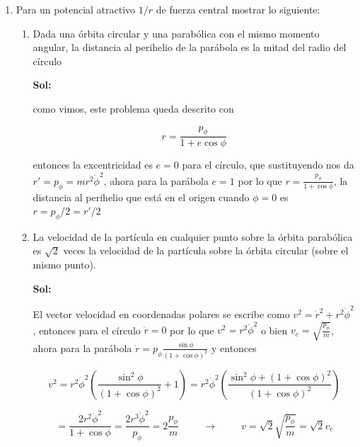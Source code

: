 \documentclass[12pt,a4paper]{article}
\begin{document}
\begin{enumerate}
\item Para un potencial atractivo $1/r$ de fuerza central mostrar lo siguiente:

\begin{enumerate}
    \item Dada una órbita circular y una parabólica con el mismo momento angular, la distancia al perihelio de la parábola es la mitad del radio del círculo
    
    \textbf{Sol:}
    
    como vimos, este problema queda descrito con
    
    \begin{equation*}
        r = \frac{p_\phi}{1 + e \cos{\phi}}
    \end{equation*}
    
    entonces la excentricidad es $e = 0$ para el círculo, que sustituyendo nos da $r' = p_{\phi}= mr^2 \dot{\phi}^2$, ahora para la parábola $e = 1 $ por lo que $r = \frac{p_{\phi}}{1 + \cos{\phi}}$, la distancia al perihelio que está en el origen cuando $\phi = 0$ es $r = p_{\phi}/2 = r' /2$
    
    
    
    \item La velocidad de la partícula en cualquier punto sobre la órbita parabólica es $\sqrt{2}$ veces la velocidad de la partícula sobre la órbita circular (sobre el mismo punto).
    
    \textbf{Sol:}
    
    El vector velocidad en coordenadas polares se escribe como $v^2 = \dot{r}^2 + r^2 \dot{\phi}^2 $, entonces para el círculo $\dot{r} = 0$ por lo que  $v^2 = r^2 \dot{\phi}^2 $  o bien $v_c = \sqrt{\frac{p_{\phi}}{m}}$, ahora para la parábola  $\dot{r} = p_{\phi} \frac{\sin{\phi}}{(1 + \cos{\phi})^2} $ y entonces
    
    \begin{equation*}
        v^2 = r^2 \dot{\phi}^2 \left(\frac{\sin^2{\phi}}{(1+\cos{\phi})^2} + 1\right) = r^2 \dot{\phi}^2 \left(\frac{\sin^2{\phi} + (1+\cos{\phi})^2}{(1+\cos{\phi})^2}\right)
    \end{equation*}
    
    \begin{equation*}
        = \frac{2r^2 \dot{\phi}^2}{1+ \cos{\phi}} = \frac{2r^3 \dot{\phi}^2}{p_{\phi}} = 2 \frac{p_{\phi}}{m} \hspace{1cm} \rightarrow \hspace{1cm} v = \sqrt{2} \sqrt{ \frac{p_{\phi}}{m}} = \sqrt{2} v_c
    \end{equation*}
    

\end{enumerate}
\end{enumerate}
\end{document}
